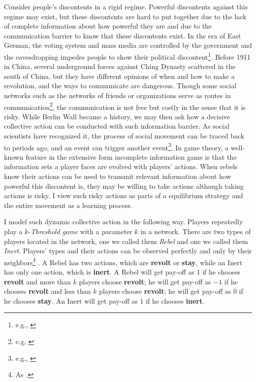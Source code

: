 \documentclass[12pt,letter]{article}
\theoremstyle{definition}
\theoremstyle{remark}
\theoremstyle{claim}
\begin{document}
Consider people's discontents in a rigid regime. Powerful discontents against this regime may exist, but these discontents are hard to put together due to the lack of complete information about how powerful they are and due to the communication barrier to know that these discontents exist. In the era of East German, the voting system and mass media are controlled by the government and the eavesdropping impedes people to show their political discontent\footnote{e.g., \citep{Lohmann2011}}. Before 1911 in China, several underground forces against Ching Dynasty scattered in the south of China, but they have different opinions of when and how to make a revolution, and the ways to communicate are dangerous. Though some social networks such as the networks of friends or organizations serve as routes in communication\footnote{e.g, \citep{Karl-Dieter1993}}, the communication is not free but costly in the sense that it is risky. While Berlin Wall became a history, we may then ask how a decisive collective action can be conducted with such information barrier. As social scientists have recognized it, the process of social movement can be traced back to periods ago, and an event can trigger another event\footnote{e.g., \citep{McAdamDoung;TarrowSidney;Tilly2001} \citep{McAdam2003} \citep{Lohmann2011}}. In game theory, a well-known feature in the extensive form incomplete information game is that the information sets a player faces are evolved with players' actions. When rebels know their actions can be used to transmit relevant information about how powerful this discontent is, they may be willing to take actions although taking actions is risky. I view such risky actions as parts of a equilibrium strategy and the entire movement as a learning process. 

I model such dynamic collective action in the following way. Players repeatedly play a $k$-\textit{Threshold game} with a parameter $k$ in a network. There are two types of players located in the network, one we called them \textit{Rebel} and one we called them \textit{Inert}.  Players' types and their actions can be observed {perfectly and only} by their neighbors\footnote{As \citep{chwe2000}.} . A Rebel has two actions, which are \textbf{revolt} or \textbf{stay}, while an Inert has only one action, which is \textbf{inert}. A Rebel will get pay-off as $1$ if he chooses \textbf{revolt} and more than $k$ players choose \textbf{revolt}; he will get pay-off as $-1$ if he chooses \textbf{revolt} and less than $k$ players choose \textbf{revolt}; he will get pay-off as $0$ if he chooses \textbf{stay}. An Inert will get pay-off as $1$ if he chooses \textbf{inert}.
\end{document}
